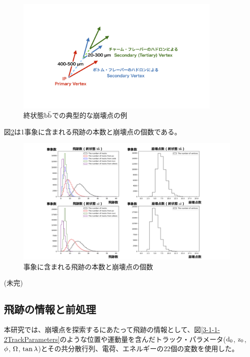 \begin{figure}[htbp]
 \centering
 \includegraphics[trim = 0 100 0 50, width=0.9\textwidth]{Figure/3Networks/3-1-1-1FinalStateBB.png}
 \caption{終状態$\rm b\bar{b}$での典型的な崩壊点の例}
 \label{3-1-1-1FinalStateBB}
\end{figure}

図\ref{3-1-1-2TracksandVertices}は1事象に含まれる飛跡の本数と崩壊点の個数である。

\begin{figure}[htbp]
 \centering
 \includegraphics[width=1.0\textwidth]{Figure/3Networks/3-1-1-2TracksandVertices.png}
 \caption{事象に含まれる飛跡の本数と崩壊点の個数}
 \label{3-1-1-2TracksandVertices}
\end{figure}


(未完)

\subsection{飛跡の情報と前処理} \label{Net:Data:TrackInformationandPreprocessing}

本研究では、崩壊点を探索するにあたって飛跡の情報として、図\ref{3-1-1-2TrackParameters}のような位置や運動量を含んだトラック・パラメータ($\rm d_0$, $\rm z_0$, $\rm \phi$, $\rm \Omega$, $\rm \tan{\lambda}$)\cite{TrackParametersLCIO}とその共分散行列、電荷、エネルギーの$22$個の変数を使用した。

